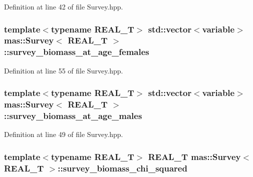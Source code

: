 Definition at line 42 of file Survey.\-hpp.

\hypertarget{structmas_1_1_survey_a150871da567d1b9e5bd7835537a1ae94}{
\subsubsection[{survey\-\_\-biomass\-\_\-at\-\_\-age\-\_\-females}]{\setlength{\rightskip}{0pt plus 5cm}template$<$typename R\-E\-A\-L\-\_\-\-T$>$ std\-::vector$<${\bf variable}$>$ {\bf mas\-::\-Survey}$<$ R\-E\-A\-L\-\_\-\-T $>$\-::survey\-\_\-biomass\-\_\-at\-\_\-age\-\_\-females}}\label{structmas_1_1_survey_a150871da567d1b9e5bd7835537a1ae94}


Definition at line 55 of file Survey.\-hpp.

\hypertarget{structmas_1_1_survey_a65aa83d0a4c0e33a58f933b7712aea76}{
\subsubsection[{survey\-\_\-biomass\-\_\-at\-\_\-age\-\_\-males}]{\setlength{\rightskip}{0pt plus 5cm}template$<$typename R\-E\-A\-L\-\_\-\-T$>$ std\-::vector$<${\bf variable}$>$ {\bf mas\-::\-Survey}$<$ R\-E\-A\-L\-\_\-\-T $>$\-::survey\-\_\-biomass\-\_\-at\-\_\-age\-\_\-males}}\label{structmas_1_1_survey_a65aa83d0a4c0e33a58f933b7712aea76}


Definition at line 49 of file Survey.\-hpp.

\hypertarget{structmas_1_1_survey_a6cfcc6ed9b540be83a61cb44e7285d79}{
\subsubsection[{survey\-\_\-biomass\-\_\-chi\-\_\-squared}]{\setlength{\rightskip}{0pt plus 5cm}template$<$typename R\-E\-A\-L\-\_\-\-T$>$ R\-E\-A\-L\-\_\-\-T {\bf mas\-::\-Survey}$<$ R\-E\-A\-L\-\_\-\-T $>$\-::survey\-\_\-biomass\-\_\-chi\-\_\-squared}}\label{structmas_1_1_survey_a6cfcc6ed9b540be83a61cb44e7285d79}


